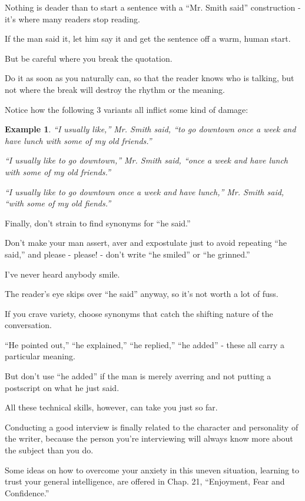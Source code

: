 \documentclass{book}
\numberwithin{equation}{section}
\newtheorem{example}{Example}[chapter]
\begin{document}
Nothing is deader than to start a sentence with a ``Mr. Smith said'' construction - it's where many readers stop reading.

If the man said it, let him say it and get the sentence off a warm, human start.

%
But be careful where you break the quotation.

Do it as soon as you naturally can, so that the reader knows who is talking, but not where the break will destroy the rhythm or the meaning.

Notice how the following 3 variants all inflict some kind of damage:
\begin{example}
    ``I usually like,'' Mr. Smith said, ``to go downtown once a week and have lunch with some of my old friends.''
    
    ``I usually like to go downtown,'' Mr. Smith said, ``once a week and have lunch with some of my old friends.''
    
    ``I usually like to go downtown once a week and have lunch,'' Mr. Smith said, ``with some of my old fiends.''
\end{example}
Finally, don't strain to find synonyms for ``he said.''

Don't make your man assert, aver and expostulate just to avoid repeating ``he said,'' and please - please! - don't write ``he smiled'' or ``he grinned.''

I've never heard anybody smile.

The reader's eye skips over ``he said'' anyway, so it's not worth a lot of fuss.

If you crave variety, choose synonyms that catch the shifting nature of the conversation.

``He pointed out,'' ``he explained,'' ``he replied,'' ``he added'' - these all carry a particular meaning.

But don't use ``he added'' if the man is merely averring and not putting a postscript on what he just said.

%
All these technical skills, however, can take you just so far.

Conducting a good interview is finally related to the character and personality of the writer, because the person you're interviewing will always know more about the subject than you do.

Some ideas on how to overcome your anxiety in this uneven situation, learning to trust your general intelligence, are offered in Chap. 21, ``Enjoyment, Fear and Confidence.''
\end{document}

